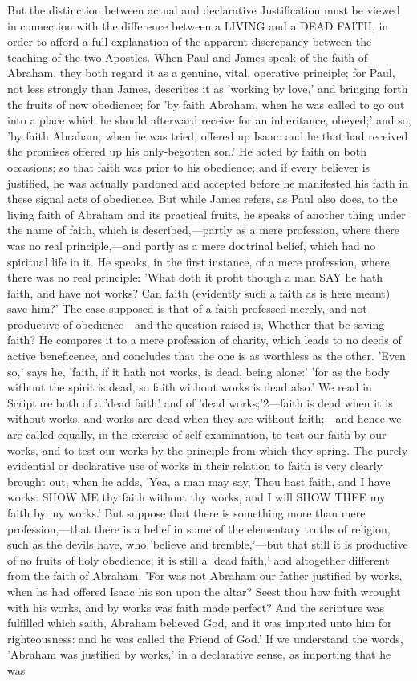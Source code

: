 \documentclass[
]{book}
\begin{document}
But the distinction between actual and declarative Justification must be viewed in connection with the difference between a LIVING and a DEAD FAITH, in order to afford a full explanation of the apparent discrepancy between the teaching of the two Apostles. When Paul and James speak of the faith of Abraham, they both regard it as a genuine, vital, operative principle; for Paul, not less strongly than James, describes it as 'working by love,' and bringing forth the fruits of new obedience; for 'by faith Abraham, when he was called to go out into a place which he should afterward receive for an inheritance, obeyed;' and so, 'by faith Abraham, when he was tried, offered up Isaac: and he that had received the promises offered up his only-begotten son.' He acted by faith on both occasions; so that faith was prior to his obedience; and if every believer is justified, he was actually pardoned and accepted before he manifested his faith in these signal acts of obedience. But while James refers, as Paul also does, to the living faith of Abraham and its practical fruits, he speaks of another thing under the name of faith, which is described,---partly as a mere profession, where there was no real principle,---and partly as a mere doctrinal belief, which had no spiritual life in it. He speaks, in the first instance, of a mere profession, where there was no real principle: 'What doth it profit though a man SAY he hath faith, and have not works? Can faith (evidently such a faith as is here meant) save him?' The case supposed is that of a faith professed merely, and not productive of obedience---and the question raised is, Whether that be saving faith? He compares it to a mere profession of charity, which leads to no deeds of active beneficence, and concludes that the one is as worthless as the other. 'Even so,' says he, 'faith, if it hath not works, is dead, being alone:' 'for as the body without the spirit is dead, so faith without works is dead also.' We read in Scripture both of a 'dead faith' and of 'dead works;'2---faith is dead when it is without works, and works are dead when they are without faith;---and hence we are called equally, in the exercise of self-examination, to test our faith by our works, and to test our works by the principle from which they spring. The purely evidential or declarative use of works in their relation to faith is very clearly brought out, when he adds, 'Yea, a man may say, Thou hast faith, and I have works: SHOW ME thy faith without thy works, and I will SHOW THEE my faith by my works.' But suppose that there is something more than mere profession,---that there is a belief in some of the elementary truths of religion, such as the devils have, who 'believe and tremble,'---but that still it is productive of no fruits of holy obedience; it is still a 'dead faith,' and altogether different from the faith of Abraham. 'For was not Abraham our father justified by works, when he had offered Isaac his son upon the altar? Seest thou how faith wrought with his works, and by works was faith made perfect? And the scripture was fulfilled which saith, Abraham believed God, and it was imputed unto him for righteousness: and he was called the Friend of God.' If we understand the words, 'Abraham was justified by works,' in a declarative sense, as importing that he was 
\end{document}
